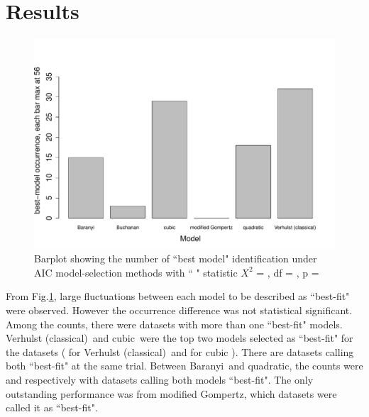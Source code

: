 \documentclass[a4paper, 11pt]{article}
\newcommand{\fve}{Verhulst (classical)}
\newcommand{\fgo}{modified Gompertz}
\newcommand{\fba}{Baranyi}
\newcommand{\fqu}{quadratic}
\newcommand{\fcu}{cubic}
\begin{document}
	\section*{Results}
	\begin{figure}[H]
		\centering
		\includegraphics[width=.8\linewidth]{../results/barplot_BestModel.pdf}
		\caption{Barplot showing the number of ``best model" identification under AIC model-selection methods with ``
			" statistic $X^{2}$ = 
			, df = 
			, p = 
		}\label{barPT}
	\end{figure}
	From Fig.\ref{barPT}, large fluctuations between each model to be described as ``best-fit" were observed.  However the occurrence difference was not statistical significant.  Among the counts, there were 
	datasets with more than one ``best-fit" models.  \fve\ and \fcu\ were the top two models selected as ``best-fit" for the 
	 datasets (
	  for \fve\ and 
	  for \fcu
	 ).  There are 
	  datasets calling both ``best-fit" at the same trial.  Between \fba\ and \fqu, the counts were 
	  and 
	  respectively with 
	 datasets calling both models ``best-fit".  The only outstanding performance was from \fgo, which 
	  datasets were called it as ``best-fit".
	  
\end{document}
